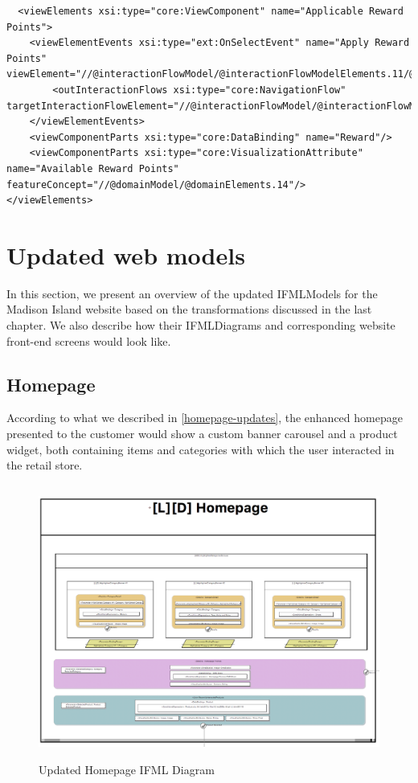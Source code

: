\vspace{0.5cm}
\lstset{language=XML}
\begin{lstlisting} 
  <viewElements xsi:type="core:ViewComponent" name="Applicable Reward Points">
    <viewElementEvents xsi:type="ext:OnSelectEvent" name="Apply Reward Points" viewElement="//@interactionFlowModel/@interactionFlowModelElements.11/@viewElements.2/@viewElements.3">
        <outInteractionFlows xsi:type="core:NavigationFlow" targetInteractionFlowElement="//@interactionFlowModel/@interactionFlowModelElements.18/@actionEvents.0"/>
    </viewElementEvents>
    <viewComponentParts xsi:type="core:DataBinding" name="Reward"/>
    <viewComponentParts xsi:type="core:VisualizationAttribute"  name="Available Reward Points" featureConcept="//@domainModel/@domainElements.14"/>
</viewElements>
\end{lstlisting}
\vspace{0.5cm}

\newpage
\section{Updated web models}

In this section, we present an overview of the updated IFMLModels for the Madison Island website based on the transformations discussed in the last chapter. We also describe how their IFMLDiagrams and corresponding website front-end screens would look like.

\subsection{Homepage}

According to what we described in \ref{homepage-updates}, the enhanced homepage presented to the customer would show a custom banner carousel and a product widget, both containing items and categories with which the user interacted in the retail store.

\vspace{0.5cm}
\begin{figure}[H]
  \centering
    \includegraphics[height=9cm]{images/diagrams/after/ifml-homepage.png}
  \caption{Updated Homepage IFML Diagram}
  \label{fig:ifml-after-homepage}
\end{figure}

